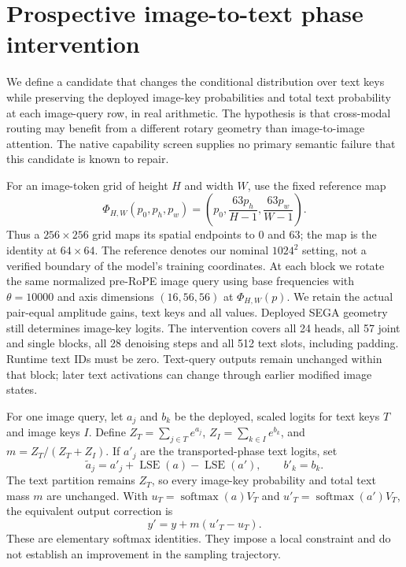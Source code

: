 \section{Prospective image-to-text phase intervention}
\label{sec:crossmodal-phase-candidate}

We define a candidate that changes the conditional distribution over text keys
while preserving the deployed image-key probabilities and total text probability
at each image-query row, in real arithmetic. The hypothesis is that cross-modal
routing may benefit from a different rotary geometry than image-to-image
attention. The native capability screen supplies no primary semantic failure
that this candidate is known to repair.

For an image-token grid of height $H$ and width $W$, use the fixed reference map
\begin{equation}
 \Phi_{H,W}(p_0,p_h,p_w)
 =\left(p_0,\frac{63p_h}{H-1},\frac{63p_w}{W-1}\right).
 \label{eq:crossmodal-phase-map}
\end{equation}
Thus a $256\times256$ grid maps its spatial endpoints to $0$ and $63$;
the map is the identity at $64\times64$. The reference denotes our nominal
$1024^2$ setting, not a verified boundary of the model's training coordinates.
At each block we rotate the same normalized pre-RoPE image query using base
frequencies with $\theta=10000$ and axis dimensions $(16,56,56)$ at
$\Phi_{H,W}(p)$. We retain the actual pair-equal amplitude gains, text keys and
all values. Deployed SEGA geometry~\citep{sega2026} still determines image-key
logits. The intervention covers all 24 heads, all 57 joint and single blocks,
all 28 denoising steps and all 512 text slots, including padding. Runtime text
IDs must be zero. Text-query outputs remain unchanged within that block;
later text activations can change through earlier modified image states.

For one image query, let $a_j$ and $b_k$ be the deployed, scaled logits for text
keys $T$ and image keys $I$. Define $Z_T=\sum_{j\in T}e^{a_j}$,
$Z_I=\sum_{k\in I}e^{b_k}$, and $m=Z_T/(Z_T+Z_I)$. If $a'_j$ are the
transported-phase text logits, set
\begin{equation}
 \widetilde a_j=a'_j+\operatorname{LSE}(a)-\operatorname{LSE}(a'),
 \qquad b'_k=b_k.
 \label{eq:crossmodal-fixed-mass}
\end{equation}
The text partition remains $Z_T$, so every image-key probability and total text
mass $m$ are unchanged. With $u_T=\operatorname{softmax}(a)V_T$ and
$u'_T=\operatorname{softmax}(a')V_T$, the equivalent output correction is
\begin{equation}
 y'=y+m(u'_T-u_T).
 \label{eq:crossmodal-output-correction}
\end{equation}
These are elementary softmax identities. They impose a local constraint and
do not establish an improvement in the sampling trajectory.

